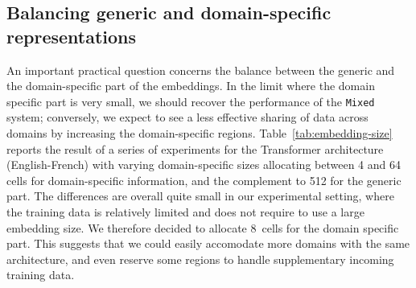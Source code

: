 \documentclass[11pt,a4paper]{article}
\newcommand{\fyTodo}[1]{\Todo[FY:]{\textcolor{orange}{#1}}}
\begin{document}
\subsection{Balancing generic and domain-specific representations\label{secc:region_size}}

An important practical question concerns the balance between the generic and the domain-specific part of the embeddings. In the limit where the domain specific part is very small, we should recover the performance of the \texttt{Mixed} system; conversely, we expect to see a less effective sharing of data across domains by increasing the domain-specific regions. Table~\ref{tab:embedding-size} reports the result of  a series of experiments for the Transformer architecture (English-French) with varying domain-specific sizes allocating between 4 and 64 cells for domain-specific information, and the complement to 512 for the generic part. The differences are overall quite small in our experimental setting, where the training data is relatively limited and does not require to use a large embedding size. We therefore decided to allocate $8$~cells for the domain specific part. This suggests that we could easily accomodate more domains with the same architecture, and even reserve some regions to handle supplementary incoming training data.  
\fyTodo{Given the ways embeddings are computed, why not add more domains, and test robustness agains data presentation order ?}

\begin{table}[!h]
\begin{center}
\end{center}
\caption{BPE-detokenized BLEU scores for the Transformer architecture for varying domain-specific embedding sizes \label{tab:embedding-size}}
\end{table}
\end{document}
